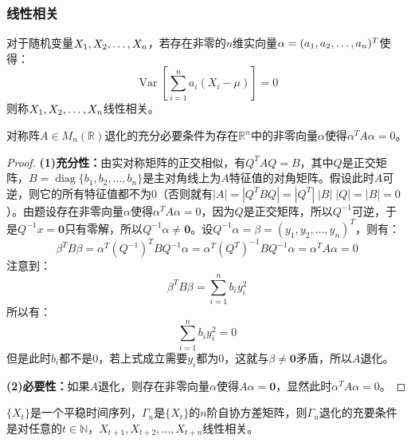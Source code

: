 \subsubsection{线性相关}
\begin{definition}\label{def:RVLinearlyDependent}
	对于随机变量$X_1, X_2, \dots, X_{n}$，若存在非零的$n$维实向量$\alpha=(a_1, a_2, \dots, a_{n})^T$使得：
	\begin{equation*}
		\operatorname{Var}\left[\sum_{i=1}^{n}a_i(X_i-\mu)\right]=0
	\end{equation*}
	则称$X_1, X_2, \dots, X_{n}$线性相关。
\end{definition}
\begin{lemma}\label{lem:aTaInvertible}
	对称阵$A\in M_{n}(\mathbb{R})$退化的充分必要条件为存在$\mathbb{R}^{n}$中的非零向量$\alpha$使得$\alpha^TA\alpha=0$。
\end{lemma}
\begin{proof}
	\textbf{(1)充分性：}由实对称矩阵的正交相似，有$Q^TAQ=B$，其中$Q$是正交矩阵，$B=\operatorname{diag}\{b_1,b_2,\dots,b_n\}$是主对角线上为$A$特征值的对角矩阵。假设此时$A$可逆，则它的所有特征值都不为$0$（否则就有$|A|=|Q^TBQ|=|Q^T|\;|B|\;|Q|=|B|=0$）。由题设存在非零向量$\alpha$使得$\alpha^TA\alpha=0$，因为$Q$是正交矩阵，所以$Q^{-1}$可逆，于是$Q^{-1}x=\mathbf{0}$只有零解，所以$Q^{-1}\alpha\ne\mathbf{0}$。设$Q^{-1}\alpha=\beta=(y_1,y_2,\dots,y_n)^T$，则有：
	\begin{equation*}
		\beta^TB\beta=\alpha^T(Q^{-1})^TBQ^{-1}\alpha=\alpha^T(Q^T)^{-1}BQ^{-1}\alpha=\alpha^TA\alpha=0
	\end{equation*}
	注意到：
	\begin{equation*}
		\beta^TB\beta=\sum_{i=1}^{n}b_iy_i^2
	\end{equation*}
	所以有：
	\begin{equation*}
		\sum_{i=1}^{n}b_iy_i^2=0
	\end{equation*}
	但是此时$b_i$都不是$0$，若上式成立需要$y_i$都为$0$，这就与$\beta\ne\mathbf{0}$矛盾，所以$A$退化。\par
	\textbf{(2)必要性：}如果$A$退化，则存在非零向量$\alpha$使得$A\alpha=\mathbf{0}$，显然此时$\alpha^TA\alpha=0$。
\end{proof}
\begin{theorem}\label{theo:TSLinearlyIndependent}
	$\{X_t\}$是一个平稳时间序列，$\Gamma_n$是$\{X_t\}$的$n$阶自协方差矩阵，则$\Gamma_n$退化的充要条件是对任意的$t\in\mathbb{N}$，$X_{t+1},X_{t+2},\dots,X_{t+n}$线性相关。
\end{theorem}
